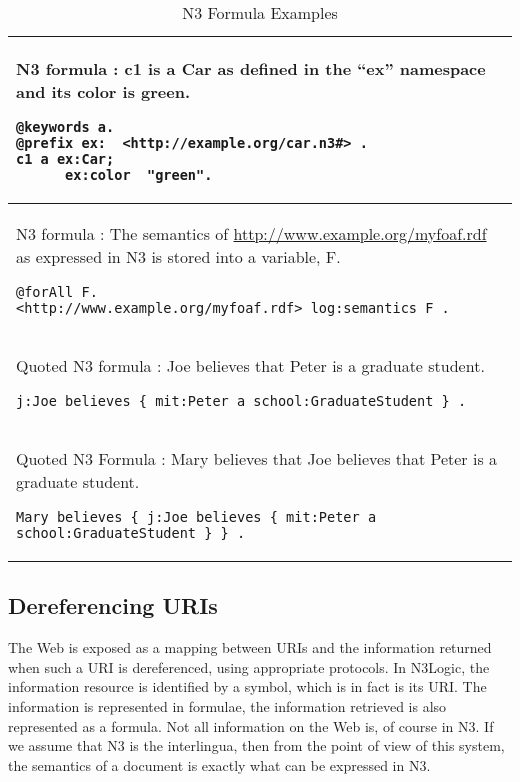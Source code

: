 \documentclass{tlp}
\begin{document}
\begin{table} [!th]
\begin{tabular}{p{12cm}}

\hline 

N3 formula : c1 is a Car as defined in the ``ex'' namespace and its
color is green.

\begin{verbatim}
@keywords a.
@prefix ex:  <http://example.org/car.n3#> .
c1 a ex:Car;
      ex:color  "green".\end{verbatim}\\

\hline 

N3 formula : The semantics of
\url{http://www.example.org/myfoaf.rdf} as expressed in N3 is
stored into a variable, F.

\begin{verbatim}
@forAll F.
<http://www.example.org/myfoaf.rdf> log:semantics F . 
\end{verbatim}\\

\hline

Quoted N3 formula : Joe believes that Peter is a graduate student.

\begin{verbatim}
j:Joe believes { mit:Peter a school:GraduateStudent } .
\end{verbatim}\\

\hline

Quoted N3 Formula : Mary believes that Joe believes that Peter is a
graduate student.

\begin{verbatim}
Mary believes { j:Joe believes { mit:Peter a school:GraduateStudent } } .
\end{verbatim}\\

\hline
\end{tabular}
\caption{N3 Formula Examples}
\label{n3formula}
\end{table}


\subsection{Dereferencing URIs}

The Web is exposed as a mapping between URIs and the information
returned when such a URI is dereferenced, using appropriate protocols.
In N3Logic, the information resource is identified by a symbol, which
is in fact is its URI. The information is represented in formulae, the
information retrieved is also represented as a formula.  Not all
information on the Web is, of course in N3. If we assume that N3 is
the interlingua, then from the point of view of this system, the
semantics of a document is exactly what can be expressed in N3.
\end{document}
